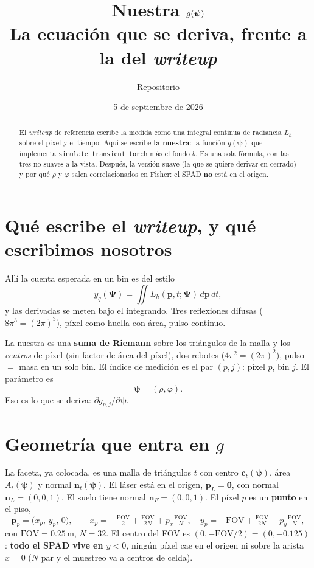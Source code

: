 \documentclass[11pt,a4paper]{article}
\title{\textbf{Nuestra $g(\vect\psi)$}\\[2mm]
\large La ecuación que se deriva, frente a la del \emph{writeup}}
\author{Repositorio \code{crb}}
\date{5 de septiembre de 2026}
\newcommand{\vect}[1]{\boldsymbol{#1}}
\newcommand{\code}[1]{\texttt{#1}}
\theoremstyle{definition}
\begin{document}
\maketitle

\begin{abstract}
El \emph{writeup} de referencia escribe la medida como una integral continua
de radiancia $L_h$ sobre el p\'ixel y el tiempo. Aqu\'i se escribe
\textbf{la nuestra}: la funci\'on $g(\vect\psi)$ que implementa
\code{simulate\_transient\_torch} m\'as el fondo $b$. Es una sola f\'ormula,
con las tres no suaves a la vista. Despu\'es, la versi\'on suave (la que se
quiere derivar en cerrado) y por qu\'e $\rho$ y $\varphi$ salen correlacionados
en Fisher: el SPAD \textbf{no} est\'a en el origen.
\end{abstract}

\section{Qu\'e escribe el \emph{writeup}, y qu\'e escribimos nosotros}

All\'i la cuenta esperada en un bin es del estilo
%
\[
y_q(\vect\Psi)
=\iint L_h(\vect p,t;\vect\Psi)\,d\vect p\,dt,
\]
%
y las derivadas se meten bajo el integrando. Tres reflexiones difusas
($8\pi^3=(2\pi)^3$), p\'ixel como huella con \'area, pulso continuo.

La nuestra es una \textbf{suma de Riemann} sobre los tri\'angulos de la malla
y los \emph{centros} de p\'ixel (sin factor de \'area del p\'ixel), dos
rebotes ($4\pi^2=(2\pi)^2$), pulso $=$ masa en un solo bin. El \'indice de
medici\'on es el par $(p,j)$: p\'ixel $p$, bin $j$. El par\'ametro es
%
\begin{equation}
\vect\psi=(\rho,\varphi).
\end{equation}
%
Eso es lo que se deriva: $\partial g_{p,j}/\partial\vect\psi$.

\section{Geometr\'ia que entra en $g$}

La faceta, ya colocada, es una malla de tri\'angulos $t$ con centro
$\vect c_t(\vect\psi)$, \'area $A_t(\vect\psi)$ y normal
$\vect n_t(\vect\psi)$. El l\'aser est\'a en el origen,
$\vect p_L=\vect 0$, con normal $\vect n_L=(0,0,1)$. El suelo tiene normal
$\vect n_F=(0,0,1)$. El p\'ixel $p$ es un \textbf{punto} en el piso,
%
\begin{equation}
\label{eq:pixel}
\vect p_p
=
\bigl(x_p,\, y_p,\, 0\bigr),
\qquad
x_p
=
-\tfrac{\mathrm{FOV}}{2}+\tfrac{\mathrm{FOV}}{2N}+p_x\tfrac{\mathrm{FOV}}{N},
\quad
y_p
=
-\mathrm{FOV}+\tfrac{\mathrm{FOV}}{2N}+p_y\tfrac{\mathrm{FOV}}{N},
\end{equation}
%
con $\mathrm{FOV}=0.25\,\mathrm{m}$, $N=32$. El centro del FOV es
$(0,-\mathrm{FOV}/2)=(0,-0.125)$: \textbf{todo el SPAD vive en $y<0$},
ning\'un p\'ixel cae en el origen ni sobre la arista $x=0$
($N$ par y el muestreo va a centros de celda).
\end{document}
